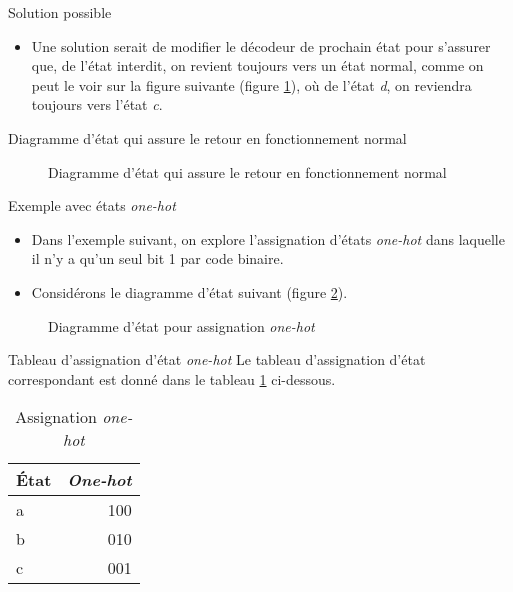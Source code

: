 \documentclass[presentation]{beamer}
\begin{document}
\begin{frame}[label={sec:org619a926}]{Solution possible}
\begin{itemize}
\item Une solution serait de modifier le décodeur de prochain état pour s'assurer que, de l'état interdit, on revient toujours vers un état normal, comme on peut le voir sur la figure suivante (figure \ref{fig:orgc9d114f}), où de l'état \emph{d}, on reviendra toujours vers l'état \emph{c}.
\end{itemize}
\end{frame}

\begin{frame}[label={sec:orgb86c4a8}]{Diagramme d'état qui assure le retour en fonctionnement normal}
\begin{figure}[htbp]
\centering

\caption{\label{fig:orgc9d114f}Diagramme d'état qui assure le retour en fonctionnement normal}
\end{figure}
\end{frame}

\begin{frame}[label={sec:orgf0ad890}]{Exemple avec états \emph{one-hot}}
\begin{itemize}
\item Dans l'exemple suivant, on explore l'assignation d'états \emph{one-hot} dans laquelle il n'y a qu'un seul bit 1 par code binaire.

\item Considérons le diagramme d'état suivant (figure \ref{fig:org95325e8}).
\end{itemize}

\begin{figure}[htbp]
\centering

\caption{\label{fig:org95325e8}Diagramme d'état pour assignation \emph{one-hot}}
\end{figure}
\end{frame}

\begin{frame}[label={sec:org65d9682}]{Tableau d'assignation d'état \emph{one-hot}}
Le tableau d'assignation d'état correspondant est donné dans le
tableau \ref{tab:orgf65f0c3} ci-dessous.

\begin{table}[htbp]
\caption{\label{tab:orgf65f0c3}Assignation \emph{one-hot}}
\centering
\begin{tabular}{lr}
État & \emph{One-hot}\\
\hline
a & 100\\
b & 010\\
c & 001\\
\end{tabular}
\end{table}
\end{frame}
\end{document}
